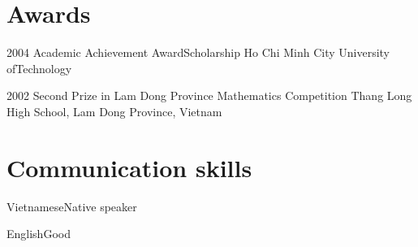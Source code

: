 \documentclass{tccv}
\begin{document}
\section{Awards}

\begin{yearlist}

\item{2004}
     {Academic Achievement Award\newline Scholarship}
     {Ho Chi Minh City University of\newline Technology}

\item{2002}
     {Second Prize in Lam Dong Province Mathematics Competition}
     {Thang Long High School, Lam Dong Province, Vietnam}

\end{yearlist}

\section{Communication skills}

\begin{factlist}
\item{Vietnamese}{Native speaker}
\item{English}{Good}
\end{factlist}
\end{document}

